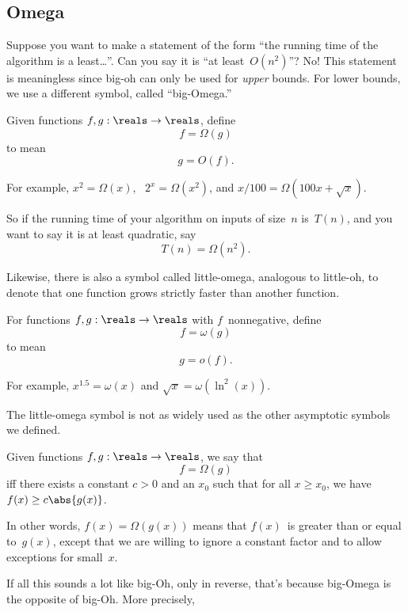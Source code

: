 \subsection{Omega}\label{omega_subsec}

Suppose you want to make a statement of the form ``the running time of
the algorithm is a least\dots''.  Can you say it is ``at
least~$O(n^2)$''?  No!  This statement is meaningless since big-oh can
only be used for \emph{upper} bounds.  For lower bounds, we use a
different symbol, called ``big-Omega.''
\begin{definition}\label{def:Omega}
Given functions $f, g : \reals \to \reals$, define
\[
    f = \Omega(g)
\]
to mean
\[
g = O(f).
\]
\end{definition}
For example, $x^2 = \Omega(x)$, \ $2^x = \Omega(x^2)$, and $x/100 =
\Omega(100 x + \sqrt{x})$.

So if the running time of your algorithm on inputs of size~$n$
is~$T(n)$, and you want to say it is at least quadratic, say
\[
    T(n) = \Omega(n^2).
\]

Likewise, there is also a symbol called little-omega, analogous to
little-oh, to denote that one function grows strictly faster than
another function.

\begin{definition}\label{def:omega}
For functions $f, g: \reals \to \reals$ with $f$~nonnegative, define
\[
    f = \omega(g)
\]
to mean
\[
g = o(f).
\]
\end{definition}

For example, $x^{1.5} = \omega(x)$ and $\sqrt{x} = \omega(\ln^2(x))$.

The little-omega symbol is not as widely used as the other asymptotic
symbols we defined.

\iffalse

\begin{definition}\label{def:Omega}
Given functions $f, g : \reals \to \reals$, we say that
\[
    f = \Omega(g)
\]
iff there exists a constant $c > 0$ and an $x_0$ such that for all $x
\ge x_0$, we have $f(x) \ge c \abs{g(x)}$.
\end{definition}

In other words, $f(x) = \Omega(g(x))$ means that $f(x)$~is greater
than or equal to~$g(x)$, except that we are willing to ignore a
constant factor and to allow exceptions for small~$x$.

If all this sounds a lot like big-Oh, only in reverse, that's because
big-Omega is the opposite of big-Oh.  More precisely,

